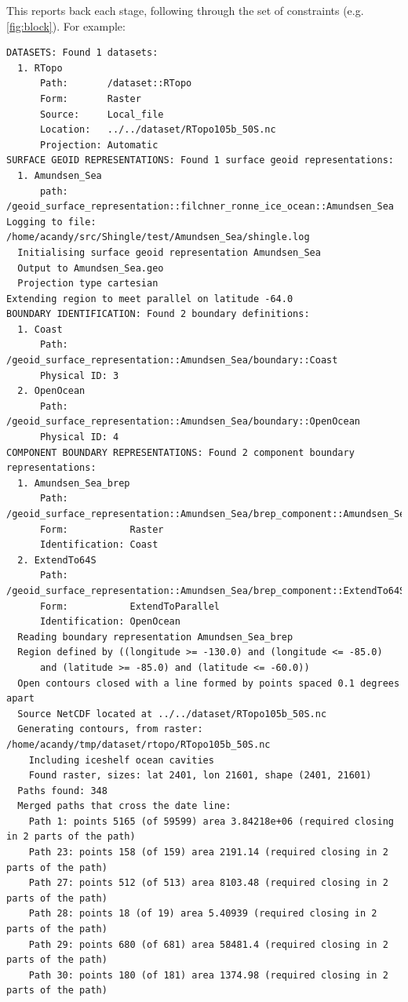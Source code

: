 \documentclass[a4paper, 10pt]{book}
\begin{document}
\noindent
This reports back each stage, following through the set of constraints (e.g. \cref{fig:block}).
For example:
\begin{Verbatim}[fontsize=\scriptsize]
DATASETS: Found 1 datasets:
  1. RTopo
      Path:       /dataset::RTopo
      Form:       Raster
      Source:     Local_file
      Location:   ../../dataset/RTopo105b_50S.nc
      Projection: Automatic
SURFACE GEOID REPRESENTATIONS: Found 1 surface geoid representations:
  1. Amundsen_Sea
      path:      /geoid_surface_representation::filchner_ronne_ice_ocean::Amundsen_Sea
Logging to file: /home/acandy/src/Shingle/test/Amundsen_Sea/shingle.log
  Initialising surface geoid representation Amundsen_Sea
  Output to Amundsen_Sea.geo
  Projection type cartesian
Extending region to meet parallel on latitude -64.0
BOUNDARY IDENTIFICATION: Found 2 boundary definitions:
  1. Coast
      Path:        /geoid_surface_representation::Amundsen_Sea/boundary::Coast
      Physical ID: 3
  2. OpenOcean
      Path:        /geoid_surface_representation::Amundsen_Sea/boundary::OpenOcean
      Physical ID: 4
COMPONENT BOUNDARY REPRESENTATIONS: Found 2 component boundary representations:
  1. Amundsen_Sea_brep
      Path:           /geoid_surface_representation::Amundsen_Sea/brep_component::Amundsen_Sea_brep
      Form:           Raster
      Identification: Coast
  2. ExtendTo64S
      Path:           /geoid_surface_representation::Amundsen_Sea/brep_component::ExtendTo64S
      Form:           ExtendToParallel
      Identification: OpenOcean
  Reading boundary representation Amundsen_Sea_brep
  Region defined by ((longitude >= -130.0) and (longitude <= -85.0)
      and (latitude >= -85.0) and (latitude <= -60.0))
  Open contours closed with a line formed by points spaced 0.1 degrees apart
  Source NetCDF located at ../../dataset/RTopo105b_50S.nc
  Generating contours, from raster: /home/acandy/tmp/dataset/rtopo/RTopo105b_50S.nc
    Including iceshelf ocean cavities
    Found raster, sizes: lat 2401, lon 21601, shape (2401, 21601)
  Paths found: 348
  Merged paths that cross the date line: 
    Path 1: points 5165 (of 59599) area 3.84218e+06 (required closing in 2 parts of the path)
    Path 23: points 158 (of 159) area 2191.14 (required closing in 2 parts of the path)
    Path 27: points 512 (of 513) area 8103.48 (required closing in 2 parts of the path)
    Path 28: points 18 (of 19) area 5.40939 (required closing in 2 parts of the path)
    Path 29: points 680 (of 681) area 58481.4 (required closing in 2 parts of the path)
    Path 30: points 180 (of 181) area 1374.98 (required closing in 2 parts of the path)

\end{Verbatim}
\end{document}
